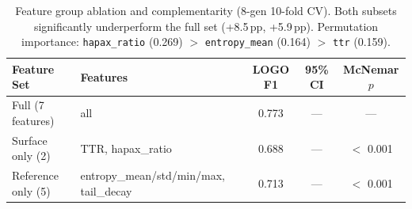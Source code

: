 \begin{table}[t]
\centering
\small
\caption{Feature group ablation and complementarity (8-gen 10-fold CV).
Both subsets significantly underperform the full set (+8.5\,pp, +5.9\,pp).
Permutation importance: \texttt{hapax\_ratio} (0.269) $>$ \texttt{entropy\_mean} (0.164) $>$ \texttt{ttr} (0.159).}
\label{tab:feature-ablation}
\begin{tabular}{lp{3.2cm}ccc}
\toprule
\textbf{Feature Set} & \textbf{Features} & \textbf{LOGO F1} & \textbf{95\% CI} & \textbf{McNemar $p$} \\
\midrule
Full (7 features) & all & 0.773 & --- & --- \\
Surface only (2)  & TTR, hapax\_ratio & 0.688 & --- & $<$ 0.001 \\
Reference only (5) & entropy\_mean/std/min/max, tail\_decay & 0.713 & --- & $<$ 0.001 \\
\bottomrule
\end{tabular}
\end{table}
